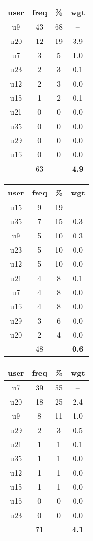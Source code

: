 \begin{tabular}{ |c|c|c|c| }
	\hline
	\textbf{user} & \textbf{freq} & \textbf{\%} & \textbf{wgt} \\
	\hline
	u9 & 43 & 68 & -- \\
	u20 & 12 & 19 & 3.9 \\
	u7 & 3 & 5 & 1.0 \\
	u23 & 2 & 3 & 0.1 \\
	u12 & 2 & 3 & 0.0 \\
	u15 & 1 & 2 & 0.1 \\
	u21 & 0 & 0 & 0.0 \\
	u35 & 0 & 0 & 0.0 \\
	u29 & 0 & 0 & 0.0 \\
	u16 & 0 & 0 & 0.0 \\
	 & 63 & & \textbf{4.9} \\
	\hline
\end{tabular}
\begin{tabular}{ |c|c|c|c| }
	\hline
	\textbf{user} & \textbf{freq} & \textbf{\%} & \textbf{wgt} \\
	\hline
	u15 & 9 & 19 & -- \\
	u35 & 7 & 15 & 0.3 \\
	u9 & 5 & 10 & 0.3 \\
	u23 & 5 & 10 & 0.0 \\
	u12 & 5 & 10 & 0.0 \\
	u21 & 4 & 8 & 0.1 \\
	u7 & 4 & 8 & 0.0 \\
	u16 & 4 & 8 & 0.0 \\
	u29 & 3 & 6 & 0.0 \\
	u20 & 2 & 4 & 0.0 \\
	 & 48 & & \textbf{0.6} \\
	\hline
\end{tabular}
\begin{tabular}{ |c|c|c|c| }
	\hline
	\textbf{user} & \textbf{freq} & \textbf{\%} & \textbf{wgt} \\
	\hline
	u7 & 39 & 55 & -- \\
	u20 & 18 & 25 & 2.4 \\
	u9 & 8 & 11 & 1.0 \\
	u29 & 2 & 3 & 0.5 \\
	u21 & 1 & 1 & 0.1 \\
	u35 & 1 & 1 & 0.0 \\
	u12 & 1 & 1 & 0.0 \\
	u15 & 1 & 1 & 0.0 \\
	u16 & 0 & 0 & 0.0 \\
	u23 & 0 & 0 & 0.0 \\
	 & 71 & & \textbf{4.1} \\
	\hline
\end{tabular}

